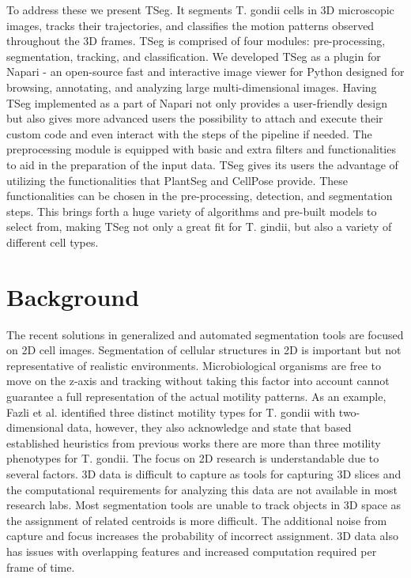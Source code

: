 \documentclass[./dissertation.tex]{subfiles}
\begin{document}
To address these we present TSeg. It segments T. gondii cells in 3D microscopic images, tracks their trajectories, and classifies the motion patterns observed throughout the 3D frames. TSeg is comprised of four modules: pre-processing, segmentation, tracking, and classification. We developed TSeg as a plugin for Napari \cite{sofroniew_nicholas_2022_6598542} - an open-source fast and interactive image viewer for Python designed for browsing, annotating, and analyzing large multi-dimensional images. Having TSeg implemented as a part of Napari not only provides a user-friendly design but also gives more advanced users the possibility to attach and execute their custom code and even interact with the steps of the pipeline if needed. The preprocessing module is equipped with basic and extra filters and functionalities to aid in the preparation of the input data. TSeg gives its users the advantage of utilizing the functionalities that PlantSeg and CellPose provide. These functionalities can be chosen in the pre-processing, detection, and segmentation steps. This brings forth a huge variety of algorithms and pre-built models to select from, making TSeg not only a great fit for T. gindii, but also a variety of different cell types.

\section{Background}

The recent solutions in generalized and automated segmentation tools are focused on 2D cell images. Segmentation of cellular structures in 2D is important but not representative of realistic environments. Microbiological organisms are free to move on the z-axis and tracking without taking this factor into account cannot guarantee a full representation of the actual motility patterns. As an example, Fazli et al. \cite{fazli2018unsupervised} identified three distinct motility types for T. gondii with two-dimensional data, however, they also acknowledge and state that based established heuristics from previous works there are more than three motility phenotypes for T. gondii. The focus on 2D research is understandable due to several factors. 3D data is difficult to capture as tools for capturing 3D slices and the computational requirements for analyzing this data are not available in most research labs. Most segmentation tools are unable to track objects in 3D space as the assignment of related centroids is more difficult. The additional noise from capture and focus increases the probability of incorrect assignment. 3D data also has issues with overlapping features and increased computation required per frame of time.
\end{document}
